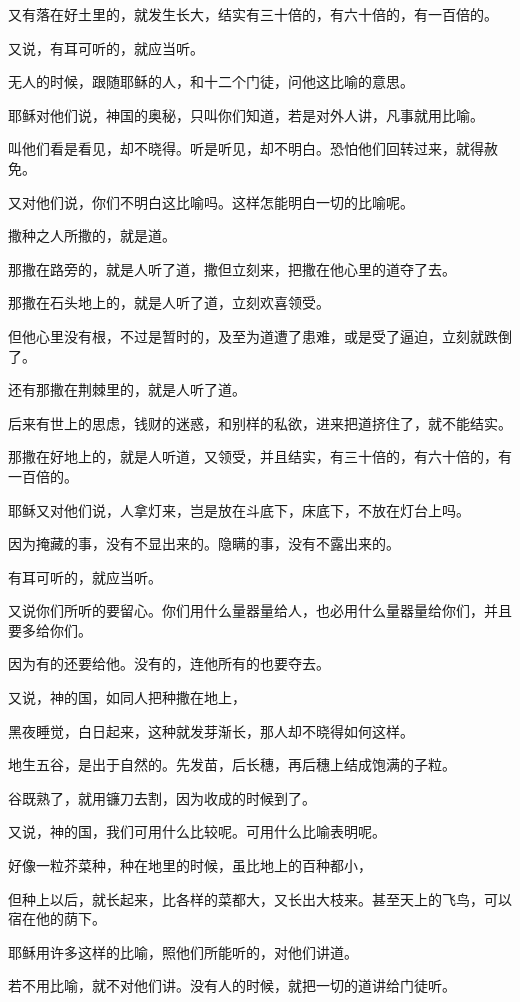 \documentclass[12pt,oneside]{book}
\begin{document}
又有落在好土里的，就发生长大，结实有三十倍的，有六十倍的，有一百倍的。

又说，有耳可听的，就应当听。

无人的时候，跟随耶稣的人，和十二个门徒，问他这比喻的意思。

耶稣对他们说，神国的奥秘，只叫你们知道，若是对外人讲，凡事就用比喻。

叫他们看是看见，却不晓得。听是听见，却不明白。恐怕他们回转过来，就得赦免。

又对他们说，你们不明白这比喻吗。这样怎能明白一切的比喻呢。

撒种之人所撒的，就是道。

那撒在路旁的，就是人听了道，撒但立刻来，把撒在他心里的道夺了去。

那撒在石头地上的，就是人听了道，立刻欢喜领受。

但他心里没有根，不过是暂时的，及至为道遭了患难，或是受了逼迫，立刻就跌倒了。

还有那撒在荆棘里的，就是人听了道。

后来有世上的思虑，钱财的迷惑，和别样的私欲，进来把道挤住了，就不能结实。

那撒在好地上的，就是人听道，又领受，并且结实，有三十倍的，有六十倍的，有一百倍的。

耶稣又对他们说，人拿灯来，岂是放在斗底下，床底下，不放在灯台上吗。

因为掩藏的事，没有不显出来的。隐瞒的事，没有不露出来的。

有耳可听的，就应当听。

又说你们所听的要留心。你们用什么量器量给人，也必用什么量器量给你们，并且要多给你们。

因为有的还要给他。没有的，连他所有的也要夺去。

又说，神的国，如同人把种撒在地上，

黑夜睡觉，白日起来，这种就发芽渐长，那人却不晓得如何这样。

地生五谷，是出于自然的。先发苗，后长穗，再后穗上结成饱满的子粒。

谷既熟了，就用镰刀去割，因为收成的时候到了。

又说，神的国，我们可用什么比较呢。可用什么比喻表明呢。

好像一粒芥菜种，种在地里的时候，虽比地上的百种都小，

但种上以后，就长起来，比各样的菜都大，又长出大枝来。甚至天上的飞鸟，可以宿在他的荫下。

耶稣用许多这样的比喻，照他们所能听的，对他们讲道。

若不用比喻，就不对他们讲。没有人的时候，就把一切的道讲给门徒听。
\end{document}
